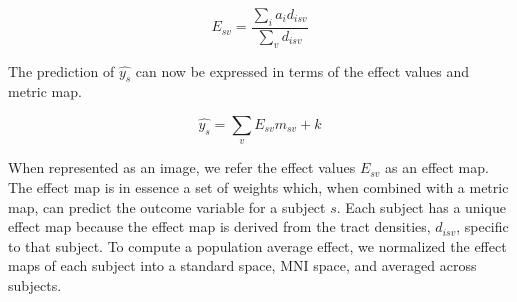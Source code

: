\begin{equation}
E_{sv} = \frac{\sum_i{ a_i d_{isv}}}{\sum_v {d_{isv}}}
\end{equation}

The prediction of $\hat{y_s}$ can now be expressed in terms of the effect values and metric map. 

\begin{equation}
\hat{y_s} = \displaystyle\sum_v{ E_{sv} m_{sv}} + k
\end{equation}

When represented as an image, we refer the effect values $E_{sv}$ as an effect map. The effect map is in essence a set of weights which, when combined with a metric map, can predict the outcome variable for a subject $s$. Each subject has a unique effect map because the effect map is derived from the tract densities, $d_{isv}$, specific to that subject. To compute a population average effect, we normalized the effect maps of each subject into a standard space, MNI space, and averaged across subjects.